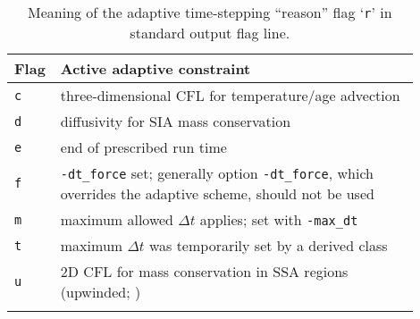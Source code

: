 \begin{table}[ht]
\caption{Meaning of the adaptive time-stepping ``reason'' flag `\texttt{r}' in standard output flag line.}\label{tab:adaptiveflag}
\begin{tabular}{p{0.05\linewidth}p{0.85\linewidth}}\hline
\textbf{Flag} & \textbf{Active adaptive constraint} \\ \hline
\verb|c| & three-dimensional CFL for temperature/age advection \cite{BBL} \\
\verb|d| & diffusivity for SIA mass conservation \cite{BBL} \\
\verb|e| & end of prescribed run time \\
\verb|f| & \verb|-dt_force| set; generally option \verb|-dt_force|, which overrides the adaptive scheme, should not be used  \\
\verb|m| & maximum allowed $\Delta t$ applies; set with \verb|-max_dt| \\
\verb|t| & maximum $\Delta t$ was temporarily set by a derived class \\
\verb|u| & 2D CFL for mass conservation in SSA regions (upwinded; \cite{BBssasliding})\\
\hline
\normalsize
\end{tabular}
\end{table}


